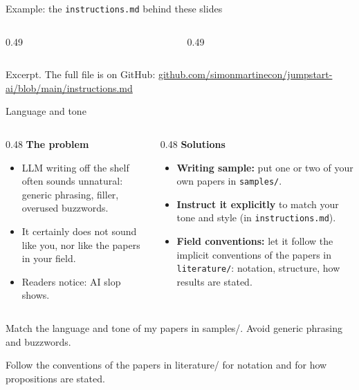 \documentclass[aspectratio=169,11pt]{beamer}
\newcommand{\prompt}[1]{\begin{promptbox}\textcolor{accent}{\faCommentDots}\enspace #1\end{promptbox}}
\newcommand{\file}[1]{\texttt{#1}}
\newcommand{\icon}[1]{\textcolor{accent}{#1}}
\begin{document}
\begin{frame}[fragile]{Example: the \file{instructions.md} behind these slides}
  \begin{columns}[T]
    \begin{column}{0.49\textwidth}
      
    \end{column}
    \begin{column}{0.49\textwidth}
      
    \end{column}
  \end{columns}
  \vspace{0.5em}
  {\fontsize{8}{10}\selectfont\icon{\faGithub}\enspace Excerpt. The full file is on GitHub: \href{https://github.com/simonmartinecon/jumpstart-ai/blob/main/instructions.md}{github.com/simonmartinecon/jumpstart-ai/blob/main/instructions.md}\par}
\end{frame}

\begin{frame}{Language and tone}
  \label{tone}
  \begin{columns}[T]
    \begin{column}{0.48\textwidth}
      \icon{\faExclamationTriangle}\enspace\textbf{The problem}
      \begin{itemize}\small
        \item LLM writing off the shelf often sounds unnatural: generic phrasing, filler, overused buzzwords.
        \item It certainly does not sound like you, nor like the papers in your field.
        \item Readers notice: AI slop shows.
      \end{itemize}
    \end{column}
    \begin{column}{0.48\textwidth}
      \icon{\faPenNib}\enspace\textbf{Solutions}
      \begin{itemize}\small
        \item \textbf{Writing sample:} put one or two of your own papers in \file{samples/}.
        \item \textbf{Instruct it explicitly} to match your tone and style (in \file{instructions.md}).
        \item \textbf{Field conventions:} let it follow the implicit conventions of the papers in \file{literature/}: notation, structure, how results are stated.
      \end{itemize}
    \end{column}
  \end{columns}
  \vspace{0.3em}
  \prompt{Match the language and tone of my papers in samples/. Avoid generic phrasing and buzzwords.}
  \prompt{Follow the conventions of the papers in literature/ for notation and for how propositions are stated.}
\end{frame}
\end{document}
